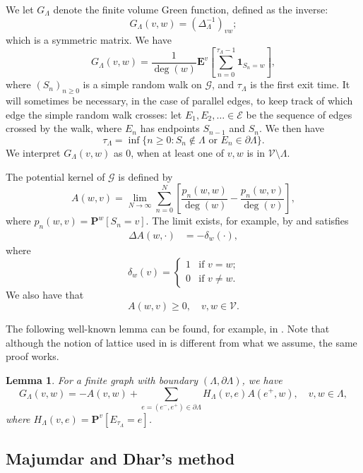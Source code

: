 \documentclass[11pt]{article}
\newtheorem{lemma}[theorem]{Lemma}
\theoremstyle{remark}
\def\cG{\mathcal{G}}
\def\cV{\mathcal{V}}
\newcommand{\eqn}[2]{\begin{equation}\label{#1}#2\end{equation}}
\newcommand{\eqnst}[1]{\begin{equation*}#1\end{equation*}}
\newcommand{\eqnspl}[2]{\begin{equation}\begin{split}\label{#1}%
   #2\end{split}\end{equation}}
\begin{document}
We let $G_\Lambda$ denote the finite volume Green function, defined as the inverse:
\eqnst{
  G_\Lambda(v,w) 
  = \left( \Delta_\Lambda^{-1} \right)_{vw}; }
which is a symmetric matrix. We have
\eqnst{
  G_\Lambda(v,w) 
  = \frac{1}{\deg(w)} \mathbf{E}^v \left[ \sum_{n=0}^{\tau_\Lambda-1} \mathbf{1}_{S_n = w} \right], }
where $(S_n)_{n \ge 0}$ is a simple random walk on $\cG$, and $\tau_\Lambda$ is the first 
exit time. It will sometimes be necessary, in the case of parallel edges, to keep track 
of which edge the simple random walk crosses: let $E_1, E_2, \dots \in \mathcal{E}$ be 
the sequence of edges crossed by the walk, where $E_n$ has endpoints $S_{n-1}$ and $S_n$. 
We then have
\[ \tau_\Lambda 
   = \inf \{ n \ge 0 : \text{$S_n \not\in \Lambda$ or 
     $E_n \in \partial \Lambda$} \}. \]
We interpret $G_\Lambda(v,w)$ as $0$, when at least one of $v, w$ is in 
$\cV \setminus \Lambda$.

The potential kernel of $\cG$ is defined by
\eqnst{
  A(w,v) 
  = \lim_{N \to \infty} \sum_{n = 0}^N \left[ \frac{p_n(w,w)}{\deg(w)} - \frac{p_n(w,v)}{\deg(v)} \right], }
where $p_n(w,v) = \mathbf{P}^w [ S_n = v ]$.
The limit exists, for example, by \cite{KU08} and satisfies
\eqnspl{e:A-apriori}{
  \Delta A (w,\cdot)
  &= - \delta_w(\cdot), }
where 
\[ \delta_w(v) 
   = \begin{cases}
     1 & \text{if $v = w$;} \\
     0 & \text{if $v \not= w$.}
   \end{cases} \]
We also have that
\eqn{e:A-nonneg}{
  A(w,v)
  \ge 0, \quad v, w \in \cV. }

The following well-known lemma can be found, for example, in \cite[Proposition 4.6.2]{LL2010}. 
Note that although the notion of lattice used in \cite{LL2010} is 
different from what we assume, the same proof works.

\begin{lemma}
\label{lem:finite-Green}
For a finite graph with boundary $(\Lambda, \partial \Lambda)$, we have 
\eqnst{
  G_\Lambda(v,w)
  = -A(v,w) + \sum_{e = (e^-,e^+) \in \partial \Lambda} H_\Lambda(v,e) A(e^+,w), 
    \quad v, w \in \Lambda, }
where $H_\Lambda(v,e) = \mathbf{P}^v [ E_{\tau_\Lambda} = e ]$.
\end{lemma}


\subsection{Majumdar and Dhar's method}
\label{ssec:MD-trick}
\end{document}

